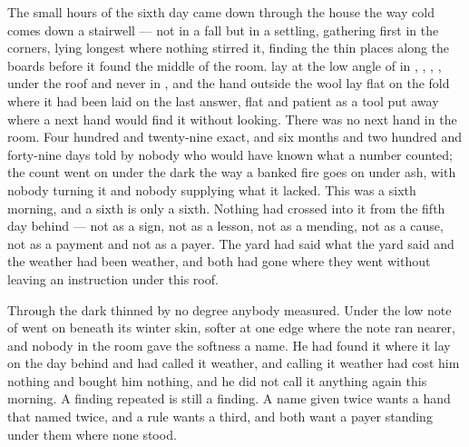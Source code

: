
The small hours of the sixth day came down through the house the way cold comes down a stairwell --- not in a fall but in a settling, gathering first in the corners, lying longest where nothing stirred it, finding the thin places along the boards before it found the middle of the room.  lay at the low angle of  in , , , , under the roof and never in , and the hand outside the wool lay flat on the fold where it had been laid on the last answer, flat and patient as a tool put away where a next hand would find it without looking. There was no next hand in the room. Four hundred and twenty-nine exact, and six months and two hundred and forty-nine days told by nobody who would have known what a number counted; the count went on under the dark the way a banked fire goes on under ash, with nobody turning it and nobody supplying what it lacked. This was a sixth morning, and a sixth is only a sixth. Nothing had crossed into it from the fifth day behind --- not as a sign, not as a lesson, not as a mending, not as a cause, not as a payment and not as a payer. The yard had said what the yard said and the weather had been weather, and both had gone where they went without leaving an instruction under this roof.

Through  the dark thinned by no degree anybody measured. Under  the low note of  went on beneath its winter skin, softer at one edge where the note ran nearer, and nobody in the room gave the softness a name. He had found it where it lay on the day behind and had called it weather, and calling it weather had cost him nothing and bought him nothing, and he did not call it anything again this morning. A finding repeated is still a finding. A name given twice wants a hand that named twice, and a rule wants a third, and both want a payer standing under them where none stood.

